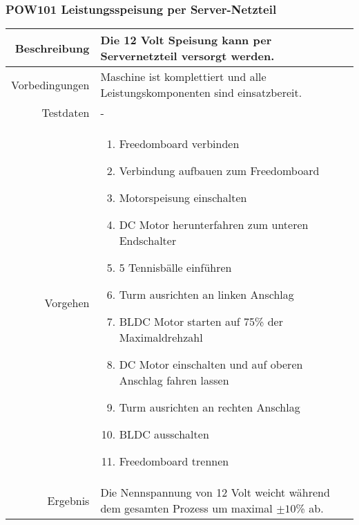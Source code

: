 \subsubsection{POW101 Leistungsspeisung per Server-Netzteil}
\begin{table}[h!]
	\renewcommand{\arraystretch}{1.5}
	\begin{tabular}{|r|p{14cm}|}
		\hline Beschreibung	&
			Die 12 Volt Speisung kann per Servernetzteil versorgt werden. \\ 
		\hline Vorbedingungen	&
			Maschine ist komplettiert und alle Leistungskomponenten
			sind einsatzbereit. \\ 
		\hline Testdaten	& - \\ 
		\hline Vorgehen		& 
		\begin{enumerate}
			\item Freedomboard verbinden
			\item Verbindung aufbauen zum Freedomboard
			\item Motorspeisung einschalten
			\item DC Motor herunterfahren zum unteren Endschalter
			\item 5 Tennisbälle einführen
			\item Turm ausrichten an linken Anschlag
			\item BLDC Motor starten auf 75\% der Maximaldrehzahl
			\item DC Motor einschalten und auf oberen Anschlag fahren lassen
			\item Turm ausrichten an rechten Anschlag
			\item BLDC ausschalten
			\item Freedomboard trennen
		\end{enumerate} \\ 
		\hline Ergebnis 	&
			Die Nennspannung von 12 Volt weicht während dem gesamten
			Prozess um maximal $\pm10$\% ab. \\ 
		\hline 
	\end{tabular}
\end{table}

\newpage
